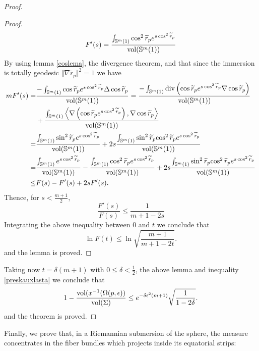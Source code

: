 \documentclass[11pt,letterpaper]{amsart}
\theoremstyle{definition}
\theoremstyle{remark}
\begin{document}
\begin{proof}
\begin{proof}
    $$
F'(s)=\frac{\int_{\mathbb{S}^m(1)}\cos^2\widetilde{r}_pe^{s \cos^2\widetilde{r}_p}}{{\rm vol}(\mathbb{S}^m(1))}
    $$
 By using lemma \ref{coslema}, the divergence theorem, and that since the immersion is totally geodesic $\Vert \nabla\widetilde{r}_p\Vert^2=1$ we have 
 $$
\begin{aligned}
mF'(s)=&\frac{-\int_{\mathbb{S}^m(1)}\cos\widetilde{r}_pe^{s \cos^2\widetilde{r}_p}\Delta \cos\widetilde{r}_p}{{\rm vol}(\mathbb{S}^m(1))}
=\frac{-\int_{\mathbb{S}^m(1)}{\rm div}\left(\cos\widetilde{r}_pe^{s \cos^2\widetilde{r}_p}\nabla \cos\widetilde{r}_p\right)}{{\rm vol}(\mathbb{S}^m(1))}\\&+\frac{\int_{\mathbb{S}^m(1)}\left\langle\nabla \left(\cos\widetilde{r}_pe^{s \cos^2\widetilde{r}_p}\right),\nabla \cos\widetilde{r}_p\right\rangle}{{\rm vol}(\mathbb{S}^m(1))}\\
=&\frac{\int_{\mathbb{S}^m(1)}\sin^2\widetilde{r}_pe^{s \cos^2\widetilde{r}_p}}{{\rm vol}(\mathbb{S}^m(1))}+2s\frac{\int_{\mathbb{S}^m(1)}\sin^2\widetilde{r}_p{ \cos^2\widetilde{r}_p}e^{s \cos^2\widetilde{r}_p}}{{\rm vol}(\mathbb{S}^m(1))}\\
=&\frac{\int_{\mathbb{S}^m(1)}e^{s \cos^2\widetilde{r}_p}}{{\rm vol}(\mathbb{S}^m(1))}-\frac{\int_{\mathbb{S}^m(1)}\cos^2\widetilde{r}_pe^{s \cos^2\widetilde{r}_p}}{{\rm vol}(\mathbb{S}^m(1))}+2s\frac{\int_{\mathbb{S}^m(1)}\sin^2\widetilde{r}_p{ \cos^2\widetilde{r}_p}e^{s \cos^2\widetilde{r}_p}}{{\rm vol}(\mathbb{S}^m(1))}\\
\leq & F(s)-F'(s)+2sF'(s).
    \end{aligned}
 $$
 Thence, for $s<\frac{m+1}{2}$,
 $$
\frac{F'(s)}{F(s)}\leq \frac{1}{m+1-2s}
 $$
 Integrating the above inequality between $0$ and $t$ we conclude that
 $$
\ln F(t)\leq \ln \sqrt{\frac{m+1}{m+1-2t}}.
 $$
 and the lemma is proved.
\end{proof}
Taking now $t=\delta(m+1)$ with $0\leq \delta<\frac{1}{2}$, the above lemma and inequality \eqref{preskauxlasta} we conclude that
\begin{equation}\label{lasta}
     1-\frac{{\rm vol}(x^{-1}(\Omega(p,\epsilon))}{{\rm vol}(\Sigma)}\leq e^{-\delta\bar\epsilon^2(m+1)}\sqrt{\frac{1}{1-2\delta}}.
\end{equation}
and the theorem is proved.\end{proof}

Finally, we prove that, in a Riemannian submersion of the sphere, the measure concentrates in the fiber bundles which projects inside its equatorial strips:
\end{document}
